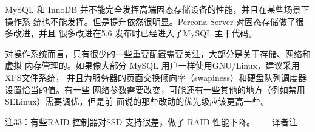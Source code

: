 MySQL 和 InnoDB 并不能完全发挥高端固态存储设备的性能，并且在某些场景下操作系
统也不能发挥。但是提升依然很明显。Percona Server 对固态存储做了很多改进，并且
很多改进在5.6 发布时已经进入了MySQL 主干代码。

对操作系统而言，只有很少的一些重要配置需要关注，大部分是关于存储、网络和虚拟
内存管理的。如果像大部分 MySQL 用户一样使用GNU/Linux，建议采用XFS文件系统，
并且为服务器的页面交换倾向率（swapiness）和硬盘队列调度器设置恰当的值。有一些
网络参数需要改变，可能还有一些其他的地方（例如禁用SELinux）需要调优，但是前
面说的那些改动的优先级应该更高一些。

注33：有些RAID 控制器对SSD 支持很差，做了 RAID 性能下降。——译者注


